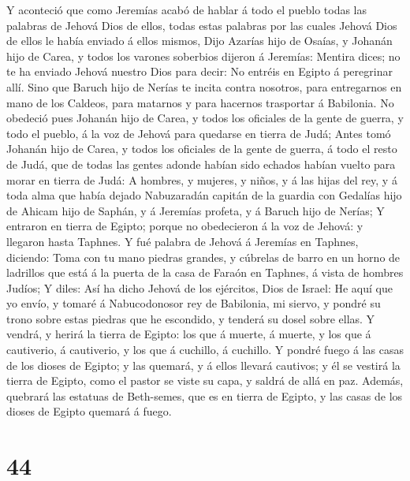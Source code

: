  Y aconteció que como Jeremías acabó de hablar á todo el
pueblo todas las palabras de Jehová Dios de ellos, todas estas palabras
por las cuales Jehová Dios de ellos le había enviado á ellos mismos,
 Dijo Azarías hijo de Osaías, y Johanán hijo de Carea, y
todos los varones soberbios dijeron á Jeremías: Mentira dices; no te ha
enviado Jehová nuestro Dios para decir: No entréis en Egipto á
peregrinar allí.  Sino que Baruch hijo de Nerías te incita
contra nosotros, para entregarnos en mano de los Caldeos, para matarnos
y para hacernos trasportar á Babilonia.  No obedeció pues
Johanán hijo de Carea, y todos los oficiales de la gente de guerra, y
todo el pueblo, á la voz de Jehová para quedarse en tierra de Judá;
 Antes tomó Johanán hijo de Carea, y todos los oficiales de
la gente de guerra, á todo el resto de Judá, que de todas las gentes
adonde habían sido echados habían vuelto para morar en tierra de Judá:
 A hombres, y mujeres, y niños, y á las hijas del rey, y á
toda alma que había dejado Nabuzaradán capitán de la guardia con
Gedalías hijo de Ahicam hijo de Saphán, y á Jeremías profeta, y á Baruch
hijo de Nerías;  Y entraron en tierra de Egipto; porque no
obedecieron á la voz de Jehová: y llegaron hasta Taphnes.  Y
fué palabra de Jehová á Jeremías en Taphnes, diciendo:  Toma
con tu mano piedras grandes, y cúbrelas de barro en un horno de
ladrillos que está á la puerta de la casa de Faraón en Taphnes, á vista
de hombres Judíos;  Y diles: Así ha dicho Jehová de los
ejércitos, Dios de Israel: He aquí que yo envío, y tomaré á
Nabucodonosor rey de Babilonia, mi siervo, y pondré su trono sobre estas
piedras que he escondido, y tenderá su dosel sobre ellas. 
Y vendrá, y herirá la tierra de Egipto: los que á muerte, á muerte, y
los que á cautiverio, á cautiverio, y los que á cuchillo, á cuchillo.
 Y pondré fuego á las casas de los dioses de Egipto; y las
quemará, y á ellos llevará cautivos; y él se vestirá la tierra de
Egipto, como el pastor se viste su capa, y saldrá de allá en paz.
 Además, quebrará las estatuas de Beth-semes, que es en
tierra de Egipto, y las casas de los dioses de Egipto quemará á fuego.

\hypertarget{section-43}{%
\section{44}\label{section-43}}

